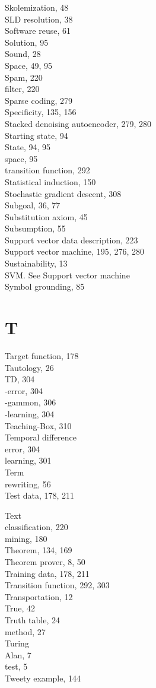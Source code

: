 \documentclass[10pt]{book}
\begin{document}
Skolemization, 48\\
SLD resolution, 38\\
Software reuse, 61\\
Solution, 95\\
Sound, 28\\
Space, 49, 95\\
Spam, 220\\
filter, 220\\
Sparse coding, 279\\
Specificity, 135, 156\\
Stacked denoising autoencoder, 279, 280\\
Starting state, 94\\
State, 94, 95\\
space, 95\\
transition function, 292\\
Statistical induction, 150\\
Stochastic gradient descent, 308\\
Subgoal, 36, 77\\
Substitution axiom, 45\\
Subsumption, 55\\
Support vector data description, 223\\
Support vector machine, 195, 276, 280\\
Sustainability, 13\\
SVM. See Support vector machine\\
Symbol grounding, 85

\section*{T}
Target function, 178\\
Tautology, 26\\
TD, 304\\
-error, 304\\
-gammon, 306\\
-learning, 304\\
Teaching-Box, 310\\
Temporal difference\\
error, 304\\
learning, 301\\
Term\\
rewriting, 56\\
Test data, 178, 211

Text\\
classification, 220\\
mining, 180\\
Theorem, 134, 169\\
Theorem prover, 8, 50\\
Training data, 178, 211\\
Transition function, 292, 303\\
Transportation, 12\\
True, 42\\
Truth table, 24\\
method, 27\\
Turing\\
Alan, 7\\
test, 5\\
Tweety example, 144
\end{document}
